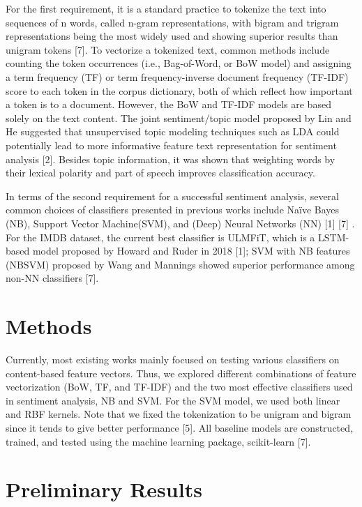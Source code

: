 \documentclass{article}
\begin{document}
For the first requirement, it is a standard practice to tokenize the text into sequences of n words, called n-gram representations, with bigram and trigram representations being the most widely used and showing superior results than unigram tokens [7]. To vectorize a tokenized text, common methods include counting the token occurrences (i.e., Bag-of-Word, or BoW model) and assigning a term frequency (TF) or term frequency-inverse document frequency (TF-IDF) score to each token in the corpus dictionary, both of which reflect how important a token is to a document. However, the BoW and TF-IDF models are based solely on the text content. The joint sentiment/topic model proposed by Lin and He suggested that unsupervised topic modeling techniques such as LDA could potentially lead to more informative feature text representation for sentiment analysis [2]. Besides topic information, it was shown that weighting words by their lexical polarity and part of speech improves classification accuracy. 


In terms of the second requirement for a successful sentiment analysis, several common choices of classifiers presented in previous works include Na{\"i}ve Bayes (NB), Support Vector Machine(SVM), and (Deep) Neural Networks (NN) [1] [7] . For the IMDB dataset, the current best classifier is ULMFiT, which is a LSTM-based model proposed by Howard and Ruder in 2018 [1]; SVM with NB features (NBSVM) proposed by Wang and Mannings showed superior performance among non-NN classifiers [7].


\section{Methods}

Currently, most existing works mainly focused on testing various classifiers on content-based feature vectors. Thus, we explored different combinations of feature vectorization (BoW, TF, and TF-IDF) and the two most effective classifiers used in sentiment analysis, NB and SVM. For the SVM model, we used both linear and RBF kernels. Note that we fixed the tokenization to be unigram and bigram since it tends to give better performance [5]. All baseline models are constructed, trained, and tested using the machine learning package, scikit-learn [7].




\section{Preliminary Results}
\end{document}
